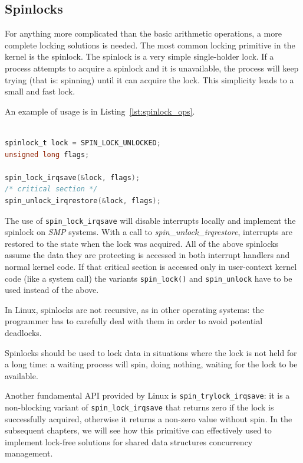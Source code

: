 \subsection{Spinlocks\label{sec:spinlocks}}

For anything more complicated than the basic arithmetic operations, a more complete
locking solutions is needed. The most common locking primitive in the kernel is the 
spinlock. The spinlock is a very simple single-holder lock. If a process attempts 
to acquire a spinlock and it is unavailable, the process will keep trying (that is:
spinning) until it can acquire the lock. This simplicity leads to a small and fast
lock.

An example of usage is in Listing~\ref{lst:spinlock_ops}.

\begin{lstlisting}[language=C, caption={Spinlock operations},
			label={lst:spinlock_ops}]

spinlock_t lock = SPIN_LOCK_UNLOCKED;
unsigned long flags;

spin_lock_irqsave(&lock, flags);
/* critical section */
spin_unlock_irqrestore(&lock, flags);

\end{lstlisting}

The use of \texttt{spin\_lock\_irqsave} will disable interrupts locally and implement the
spinlock on \emph{SMP} systems. With a call to \emph{spin\_unlock\_irqrestore}, interrupts
are restored to the state when the lock was acquired. All of the above spinlocks assume
the data they are protecting is accessed in both interrupt handlers and normal kernel
code. If that critical section is accessed only in user-context kernel code (like a 
system call) the variants \texttt{spin\_lock()} and \texttt{spin\_unlock} have to be 
used instead of the above.

In Linux, spinlocks are not recursive, as in other operating systems: the
programmer has to carefully deal with them in order to avoid potential deadlocks.

Spinlocks should be used to lock data in situations where the lock is not held for
a long time: a waiting process will spin, doing nothing, waiting for the lock to be
available.

Another fundamental API provided by Linux is \texttt{spin\_trylock\_irqsave}: it is a 
non-blocking variant of \texttt{spin\_lock\_irqsave} that returns zero if the lock is
successfully acquired, otherwise it returns a non-zero value without spin. In the
subsequent chapters, we will see how this primitive can effectively used to implement
lock-free solutions for shared data structures concurrency management.

